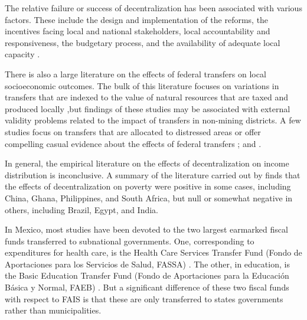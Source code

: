 \documentclass[dv_diss_main.tex]{subfiles}
\begin{document}
The relative failure or success of decentralization has been associated with various factors. These include the design and implementation of the reforms, the incentives facing local and national stakeholders, local accountability and responsiveness, the budgetary process, and the availability of adequate local capacity \citep{ahmad2005decentralization,robinson2007does,martinez2011decentralization,loayza2014more}. 

There is also a large literature on the effects of federal transfers on local socioeconomic outcomes. The bulk of this literature focuses on variations in transfers that are indexed to the value of natural resources that are taxed and produced locally \citep{loayza2013poverty,enamorado2014regional,zambrano2014global},but findings of these studies may be associated with external validity problems related to the impact of transfers in non-mining districts. A few studies focus on transfers that are allocated to distressed areas \cite{araujo2008local}or offer compelling casual evidence about the effects of federal transfers \cite{caselli2009oil}; and \cite{corbi2019regional}. 

In general, the empirical literature on the effects of decentralization on income distribution is inconclusive. A summary of the literature carried out by \cite{jutting2004decentralisation} finds that the effects of decentralization on poverty were positive in some cases, including China, Ghana, Philippines, and South Africa, but null or somewhat negative in others, including Brazil, Egypt, and India.

In Mexico, most studies have been devoted to the two largest earmarked fiscal funds transferred to subnational governments. One, corresponding to expenditures for health care, is the Health Care Services Transfer Fund (Fondo de Aportaciones para los Servicios de Salud, FASSA) \citep{moreno2001descentralizacion,merino2003descentralizacion,molina2014decentralization,martinez2011decentralization}. The other, in education, is the Basic Education Transfer Fund (Fondo de Aportaciones para la Educación Básica y Normal, FAEB) \citep{esquivel1999gasto,latapi2000financiamiento,avendano2012evaluacion}. But a significant difference of these two fiscal funds with respect to FAIS is that these are only transferred to states governments rather than municipalities.
\end{document}
